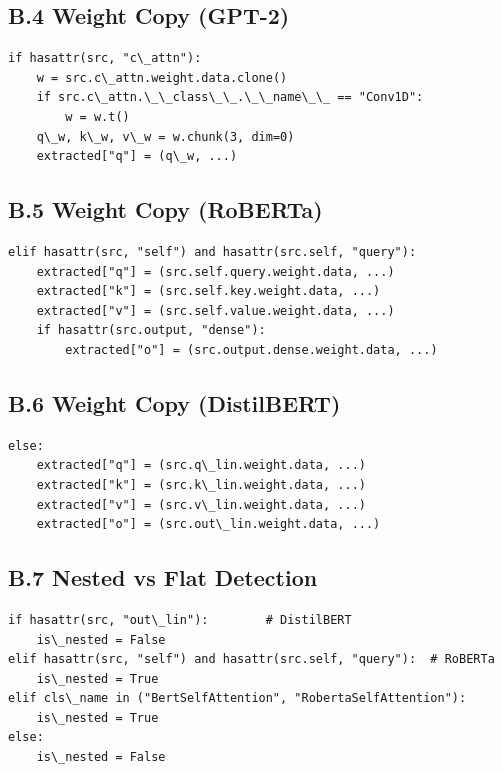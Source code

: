 \subsection{B.4 Weight Copy (GPT-2)}

\begin{lstlisting}
if hasattr(src, "c\_attn"):
    w = src.c\_attn.weight.data.clone()
    if src.c\_attn.\_\_class\_\_.\_\_name\_\_ == "Conv1D":
        w = w.t()
    q\_w, k\_w, v\_w = w.chunk(3, dim=0)
    extracted["q"] = (q\_w, ...)
\end{lstlisting}

\subsection{B.5 Weight Copy (RoBERTa)}

\begin{lstlisting}
elif hasattr(src, "self") and hasattr(src.self, "query"):
    extracted["q"] = (src.self.query.weight.data, ...)
    extracted["k"] = (src.self.key.weight.data, ...)
    extracted["v"] = (src.self.value.weight.data, ...)
    if hasattr(src.output, "dense"):
        extracted["o"] = (src.output.dense.weight.data, ...)
\end{lstlisting}

\subsection{B.6 Weight Copy (DistilBERT)}

\begin{lstlisting}
else:
    extracted["q"] = (src.q\_lin.weight.data, ...)
    extracted["k"] = (src.k\_lin.weight.data, ...)
    extracted["v"] = (src.v\_lin.weight.data, ...)
    extracted["o"] = (src.out\_lin.weight.data, ...)
\end{lstlisting}

\subsection{B.7 Nested vs Flat Detection}

\begin{lstlisting}
if hasattr(src, "out\_lin"):        # DistilBERT
    is\_nested = False
elif hasattr(src, "self") and hasattr(src.self, "query"):  # RoBERTa
    is\_nested = True
elif cls\_name in ("BertSelfAttention", "RobertaSelfAttention"):
    is\_nested = True
else:
    is\_nested = False
\end{lstlisting}

